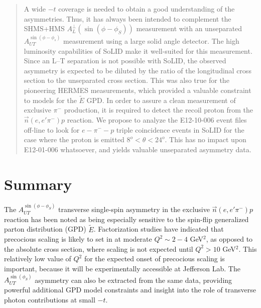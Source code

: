 \documentclass{article}
\begin{document}
\begin{abstract}
A wide $-t$ coverage is needed to obtain a good understanding of the
asymmetries.  Thus, it has always been intended to complement the SHMS+HMS
$A_L^{\perp}(\sin(\phi-\phi_S))$ measurement with an unseparated
$A_{UT}^{\sin(\phi-\phi_s)}$ measurement using a large solid angle detector.
The high luminosity capabilities of SoLID make it well-suited for this
measurement.  Since an L--T separation is not possible with SoLID, the observed
asymmetry is expected to be diluted by the ratio of the longitudinal cross
section to the unseparated cross section.  This was also true for the
pioneering HERMES measurements, which provided a valuable constraint to models
for the $\tilde{E}$ GPD.  In order to assure a clean measurement of exclusive
$\pi^-$ production, it is required to detect the recoil proton from the
$\vec{n}(e,e'\pi^-)p$ reaction.  We propose to analyze the E12-10-006 event
files off-line to look for $e-\pi^--p$ triple coincidence events in SoLID for
the case where the proton is emitted $8^o<\theta<24^o$.  This has no impact
upon E12-01-006 whatsoever, and yields valuable unseparated asymmetry data.


\end{abstract}

\newpage


\newpage


\newpage


\newpage


\section{Summary}
The $A_{UT}^{\sin(\phi-\phi_S)}$ transverse single-spin asymmetry in the
exclusive $\vec{n}(e,e'\pi^-)p$ reaction has been noted as being especially
sensitive to the spin-flip generalized parton distribution (GPD) $\tilde{E}$.
Factorization studies have indicated that precocious scaling is likely to set
in at moderate $Q^2\sim 2-4$ GeV$^2$, as opposed to the absolute cross section,
where scaling is not expected until $Q^2>10$ GeV$^2$.
This relatively low value of $Q^2$ for the expected onset of precocious scaling
is important, because it will be experimentally accessible at Jefferson Lab.
The $A_{UT}^{\sin(\phi_S)}$ asymmetry can also be extracted from the same data,
providing powerful additional GPD model constraints and insight into the role
of transverse photon contributions at small $-t$.
\end{document}
